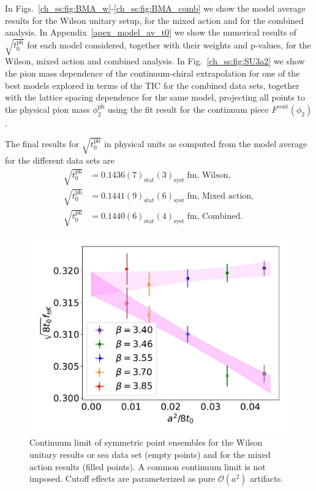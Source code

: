 In Figs.~\ref{ch_ss:fig:BMA_w}-\ref{ch_ss:fig:BMA_comb} we show the model average results for the Wilson unitary setup, for the mixed action and for the combined analysis. In Appendix~\ref{apex_model_av_t0} we show the numerical results of $\sqrt{t_0^{\textrm{ph}}}$ for each model considered, together with their weights and p-values, for the Wilson, mixed action and combined analysis. In Fig.~\ref{ch_ss:fig:SU3a2} we show the pion mass dependence of the continuum-chiral extrapolation for one of the best models explored in terms of the TIC for the combined data sets, together with the lattice spacing dependence for the same model, projecting all points to the physical pion mass $\phi_2^{\textrm{ph}}$ using the fit result for the continuum piece $F^{\textrm{cont}}(\phi_2)$.

The final results for $\sqrt{t_0^{\textrm{ph}}}$ in physical units as computed from the model average for the different data sets are
\begin{align}
\label{ch_ss:eq:t0ph}
\sqrt{t_0^{\textrm{ph}}}&=0.1436(7)_{\textrm{stat}}(3)_{\textrm{syst}}\;\textrm{fm, Wilson}, \\
\sqrt{t_0^{\textrm{ph}}}&=0.1441(9)_{\textrm{stat}}(6)_{\textrm{syst}}\;\textrm{fm, Mixed action}, \\
\sqrt{t_0^{\textrm{ph}}}&=0.1440(6)_{\textrm{stat}}(4)_{\textrm{syst}}\;\textrm{fm, Combined}.
\end{align}

\begin{figure}
    \centering
    \includegraphics[width=.7\textwidth]{./cap5/figs/continuum_sym.pdf}
    \caption{Continuum limit of symmetric point ensembles for the Wilson unitary results or sea data set (empty points) and for the mixed action results (filled points). A common continuum limit is not imposed. Cutoff effects are parameterized as pure $\mathcal{O}(a^2)$ artifacts.}
    \label{ch_ss:fig:universality}
\end{figure}


